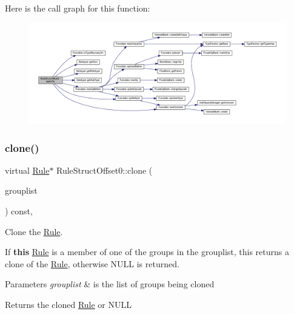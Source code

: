 Here is the call graph for this function\+:
\nopagebreak
\begin{figure}[H]
\begin{center}
\leavevmode
\includegraphics[width=350pt]{class_rule_struct_offset0_a925e149a62faa06ea1e64a9b9b52a47f_cgraph}
\end{center}
\end{figure}
\mbox{\label{class_rule_struct_offset0_a97dcd1e2e1e0649e22d204e21986bc93}} 
\subsubsection{\texorpdfstring{clone()}{clone()}}
{\footnotesize\ttfamily virtual \mbox{\hyperlink{class_rule}{Rule}}$\ast$ Rule\+Struct\+Offset0\+::clone (\begin{DoxyParamCaption}\item[{const \mbox{\hyperlink{class_action_group_list}{Action\+Group\+List}} \&}]{grouplist }\end{DoxyParamCaption}) const\hspace{0.3cm}{\ttfamily [inline]}, {\ttfamily [virtual]}}



Clone the \mbox{\hyperlink{class_rule}{Rule}}. 

If {\bfseries{this}} \mbox{\hyperlink{class_rule}{Rule}} is a member of one of the groups in the grouplist, this returns a clone of the \mbox{\hyperlink{class_rule}{Rule}}, otherwise N\+U\+LL is returned. 
\begin{DoxyParams}{Parameters}
{\em grouplist} & is the list of groups being cloned \\
\hline
\end{DoxyParams}
\begin{DoxyReturn}{Returns}
the cloned \mbox{\hyperlink{class_rule}{Rule}} or N\+U\+LL 
\end{DoxyReturn}


